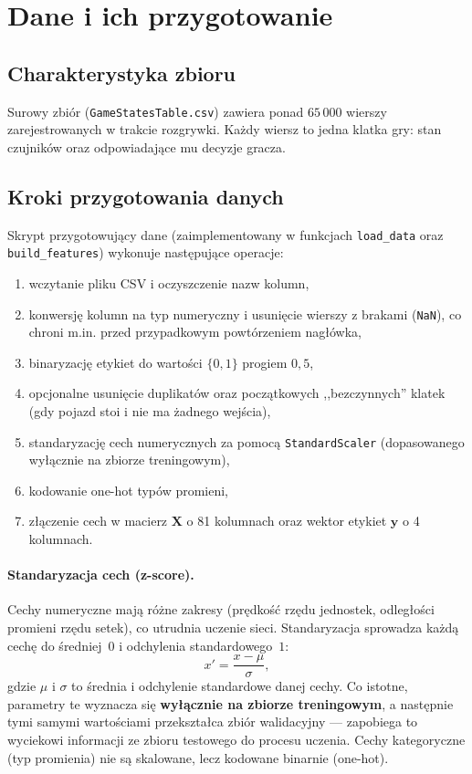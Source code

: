 \documentclass[11pt,a4paper]{article}
\begin{document}
\section{Dane i ich przygotowanie}
\label{sec:przygotowanie}

\subsection{Charakterystyka zbioru}

Surowy zbiór (\texttt{GameStatesTable.csv}) zawiera ponad $65\,000$ wierszy
zarejestrowanych w trakcie rozgrywki. Każdy wiersz to jedna klatka gry: stan
czujników oraz odpowiadające mu decyzje gracza.

\subsection{Kroki przygotowania danych}

Skrypt przygotowujący dane (zaimplementowany w funkcjach \texttt{load\_data} oraz
\texttt{build\_features}) wykonuje następujące operacje:
\begin{enumerate}[noitemsep]
  \item wczytanie pliku CSV i oczyszczenie nazw kolumn,
  \item konwersję kolumn na typ numeryczny i usunięcie wierszy z brakami
        (\texttt{NaN}), co chroni m.in. przed przypadkowym powtórzeniem nagłówka,
  \item binaryzację etykiet do wartości $\{0,1\}$ progiem $0{,}5$,
  \item opcjonalne usunięcie duplikatów oraz początkowych ,,bezczynnych'' klatek
        (gdy pojazd stoi i nie ma żadnego wejścia),
  \item standaryzację cech numerycznych za pomocą \texttt{StandardScaler}
        (dopasowanego wyłącznie na zbiorze treningowym),
  \item kodowanie one-hot typów promieni,
  \item złączenie cech w macierz $\mathbf{X}$ o 81 kolumnach oraz wektor etykiet
        $\mathbf{y}$ o 4 kolumnach.
\end{enumerate}

\paragraph{Standaryzacja cech (z-score).}
Cechy numeryczne mają różne zakresy (prędkość rzędu jednostek, odległości promieni
rzędu setek), co utrudnia uczenie sieci. Standaryzacja sprowadza każdą cechę do
średniej~$0$ i odchylenia standardowego~$1$:
\begin{equation}
x' = \frac{x - \mu}{\sigma},
\label{eq:standaryzacja}
\end{equation}
gdzie $\mu$ i $\sigma$ to średnia i odchylenie standardowe danej cechy. Co istotne,
parametry te wyznacza się \textbf{wyłącznie na zbiorze treningowym}, a następnie tymi
samymi wartościami przekształca zbiór walidacyjny --- zapobiega to wyciekowi
informacji ze zbioru testowego do procesu uczenia. Cechy kategoryczne (typ promienia)
nie są skalowane, lecz kodowane binarnie (one-hot).
\end{document}
